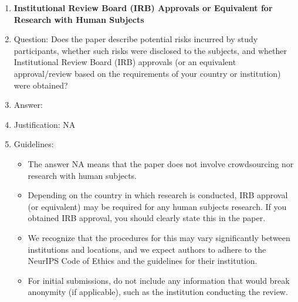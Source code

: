 \documentclass{article}
\begin{document}
\begin{enumerate}
\item {\bf Institutional Review Board (IRB) Approvals or Equivalent for Research with Human Subjects}
    \item[] Question: Does the paper describe potential risks incurred by study participants, whether such risks were disclosed to the subjects, and whether Institutional Review Board (IRB) approvals (or an equivalent approval/review based on the requirements of your country or institution) were obtained?
    \item[] Answer: \answerNA{} %
    \item[] Justification: NA
    \item[] Guidelines:
    \begin{itemize}
        \item The answer NA means that the paper does not involve crowdsourcing nor research with human subjects.
        \item Depending on the country in which research is conducted, IRB approval (or equivalent) may be required for any human subjects research. If you obtained IRB approval, you should clearly state this in the paper. 
        \item We recognize that the procedures for this may vary significantly between institutions and locations, and we expect authors to adhere to the NeurIPS Code of Ethics and the guidelines for their institution. 
        \item For initial submissions, do not include any information that would break anonymity (if applicable), such as the institution conducting the review.
    \end{itemize}

\end{enumerate}
\end{document}

